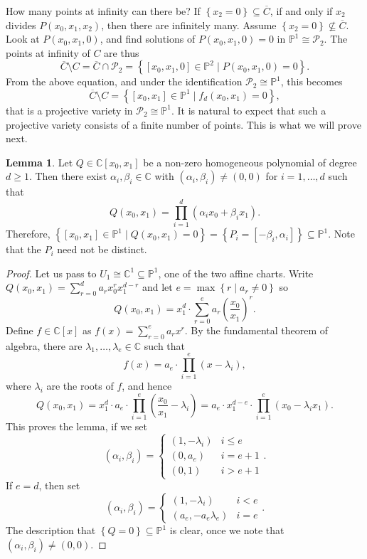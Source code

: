 \documentclass{article}
\newcommand{\C}{\mathbb{C}}
\renewcommand{\P}{\mathbb{P}}
\newcommand{\rb}[1]{\left( #1 \right)}
\renewcommand{\sb}[1]{\left[ #1 \right]}
\newcommand{\cb}[1]{\left\{ #1 \right\}}
\theoremstyle{definition}\newtheorem{definition}{Definition}[section]
\theoremstyle{definition}\newtheorem{notation}[definition]{Notation}
\theoremstyle{definition}\newtheorem{remark}[definition]{Remark}
\theoremstyle{definition}\newtheorem{example}[definition]{Example}
\theoremstyle{definition}\newtheorem{fact}{Fact}
\theoremstyle{definition}\newtheorem{exercise}{Exercise}
\newtheorem{lemma}[definition]{Lemma}
\begin{document}
How many points at infinity can there be? If $ \cb{x_2 = 0} \subseteq \overline{C} $, if and only if $ x_2 $ divides $ P\rb{x_0, x_1, x_2} $, then there are infinitely many. Assume $ \cb{x_2 = 0} \not\subseteq \overline{C} $. Look at $ P\rb{x_0, x_1, 0} $, and find solutions of $ P\rb{x_0, x_1, 0} = 0 $ in $ \P^1 \cong \mathcal{P}_2 $. The points at infinity of $ C $ are thus
$$ \overline{C} \setminus C = \overline{C} \cap \mathcal{P}_2 = \cb{\sb{x_0, x_1, 0} \in \P^2 \mid P\rb{x_0, x_1, 0} = 0}. $$
From the above equation, and under the identification $ \mathcal{P}_2 \cong \P^1 $, this becomes
$$ \overline{C} \setminus C = \cb{\sb{x_0, x_1} \in \P^1 \mid f_d\rb{x_0, x_1} = 0}, $$
that is a projective variety in $ \mathcal{P}_2 \cong \P^1 $. It is natural to expect that such a projective variety consists of a finite number of points. This is what we will prove next.

\begin{lemma}
\label{lem:6.2}
Let $ Q \in \C\sb{x_0, x_1} $ be a non-zero homogeneous polynomial of degree $ d \ge 1 $. Then there exist $ \alpha_i, \beta_i \in \C $ with $ \rb{\alpha_i, \beta_i} \ne \rb{0, 0} $ for $ i = 1, \dots, d $ such that
$$ Q\rb{x_0, x_1} = \prod_{i = 1}^d \rb{\alpha_ix_0 + \beta_ix_1}. $$
Therefore, $ \cb{\sb{x_0, x_1} \in \P^1 \mid Q\rb{x_0, x_1} = 0} = \cb{P_i = \sb{-\beta_i, \alpha_i}} \subseteq \P^1 $. Note that the $ P_i $ need not be distinct.
\end{lemma}

\begin{proof}
Let us pass to $ U_1 \cong \C^1 \subseteq \P^1 $, one of the two affine charts. Write $ Q\rb{x_0, x_1} = \sum_{r = 0}^d a_rx_0^rx_1^{d - r} $ and let $ e = \max\cb{r \mid a_r \ne 0} $ so
$$ Q\rb{x_0, x_1} = x_1^d \cdot \sum_{r = 0}^e a_r\rb{\dfrac{x_0}{x_1}}^r. $$
Define $ f \in \C\sb{x} $ as $ f\rb{x} = \sum_{r = 0}^e a_rx^r $. By the fundamental theorem of algebra, there are $ \lambda_1, \dots, \lambda_e \in \C $ such that
$$ f\rb{x} = a_e \cdot \prod_{i = 1}^e \rb{x - \lambda_i}, $$
where $ \lambda_i $ are the roots of $ f $, and hence
$$ Q\rb{x_0, x_1} = x_1^d \cdot a_e \cdot \prod_{i = 1}^e \rb{\dfrac{x_0}{x_1} - \lambda_i} = a_e \cdot x_1^{d - e} \cdot \prod_{i = 1}^e \rb{x_0 - \lambda_ix_1}. $$
This proves the lemma, if we set
$$ \rb{\alpha_i, \beta_i} = \begin{cases} \rb{1, -\lambda_i} & i \le e \\ \rb{0, a_e} & i = e + 1 \\ \rb{0, 1} & i > e + 1 \end{cases}. $$
If $ e = d $, then set
$$ \rb{\alpha_i, \beta_i} = \begin{cases} \rb{1, -\lambda_i} & i < e \\ \rb{a_e, -a_e\lambda_e} & i = e \end{cases}. $$
The description that $ \cb{Q = 0} \subseteq \P^1 $ is clear, once we note that $ \rb{\alpha_i, \beta_i} \ne \rb{0, 0} $.
\end{proof}
\end{document}
